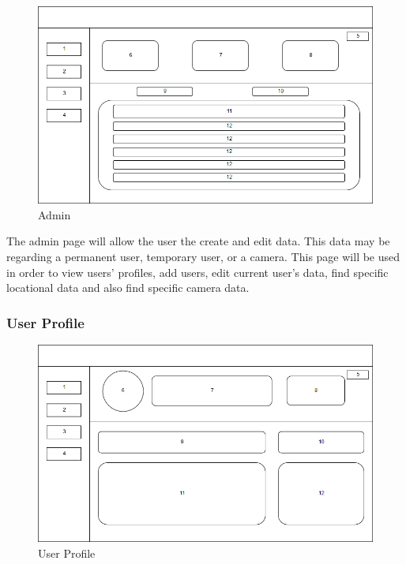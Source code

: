 \documentclass[
  english,
  a4paper,
,tablecaptionabove
]{scrartcl}
\begin{document}
\begin{figure}
\centering
\includegraphics{images/ppm-images/admin-design.png}
\caption{Admin}
\end{figure}

The admin page will allow the user the create and edit data. This data
may be regarding a permanent user, temporary user, or a camera. This
page will be used in order to view users' profiles, add users, edit
current user's data, find specific locational data and also find
specific camera data.\\
\newpage

\hypertarget{user-profile}{%
\subsubsection{User Profile}\label{user-profile}}

\begin{figure}
\centering
\includegraphics{images/ppm-images/profile-design.png}
\caption{User Profile}
\end{figure}
\end{document}
